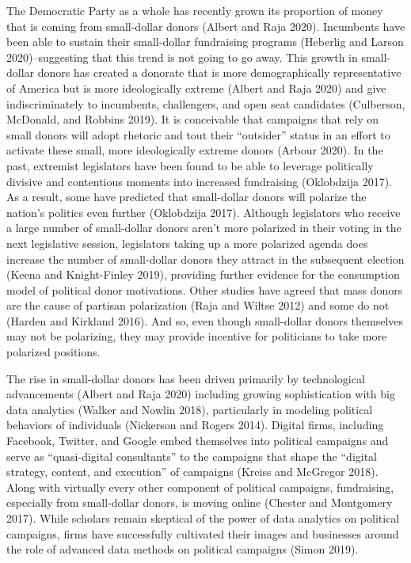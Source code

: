 \documentclass[12pt,]{article}
\begin{document}
The Democratic Party as a whole has recently grown its proportion of
money that is coming from small-dollar donors (Albert and Raja 2020).
Incumbents have been able to sustain their small-dollar fundraising
programs (Heberlig and Larson 2020)--suggesting that this trend is not
going to go away. This growth in small-dollar donors has created a
donorate that is more demographically representative of America but is
more ideologically extreme (Albert and Raja 2020) and give
indiscriminately to incumbents, challengers, and open seat candidates
(Culberson, McDonald, and Robbins 2019). It is conceivable that
campaigns that rely on small donors will adopt rhetoric and tout their
``outsider'' status in an effort to activate these small, more
ideologically extreme donors (Arbour 2020). In the past, extremist
legislators have been found to be able to leverage politically divisive
and contentious moments into increased fundraising (Oklobdzija 2017). As
a result, some have predicted that small-dollar donors will polarize the
nation's politics even further (Oklobdzija 2017). Although legislators
who receive a large number of small-dollar donors aren't more polarized
in their voting in the next legislative session, legislators taking up a
more polarized agenda does increase the number of small-dollar donors
they attract in the subsequent election (Keena and Knight-Finley 2019),
providing further evidence for the consumption model of political donor
motivations. Other studies have agreed that mass donors are the cause of
partisan polarization (Raja and Wiltse 2012) and some do not (Harden and
Kirkland 2016). And so, even though small-dollar donors themselves may
not be polarizing, they may provide incentive for politicians to take
more polarized positions.

The rise in small-dollar donors has been driven primarily by
technological advancements (Albert and Raja 2020) including growing
sophistication with big data analytics (Walker and Nowlin 2018),
particularly in modeling political behaviors of individuals (Nickerson
and Rogers 2014). Digital firms, including Facebook, Twitter, and Google
embed themselves into political campaigns and serve as ``quasi-digital
consultants'' to the campaigns that shape the ``digital strategy,
content, and execution'' of campaigns (Kreiss and McGregor 2018). Along
with virtually every other component of political campaigns,
fundraising, especially from small-dollar donors, is moving online
(Chester and Montgomery 2017). While scholars remain skeptical of the
power of data analytics on political campaigns, firms have successfully
cultivated their images and businesses around the role of advanced data
methods on political campaigns (Simon 2019).
\end{document}
